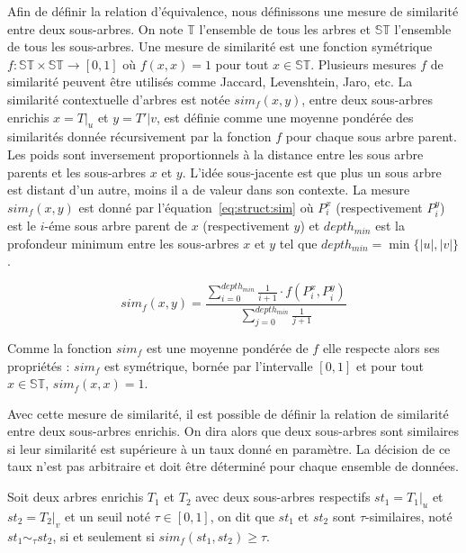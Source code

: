 Afin de définir la relation d'équivalence, nous définissons une mesure de similarité entre deux sous-arbres.
On note $\mathbb{T}$ l'ensemble de tous les arbres et $\mathbb{ST}$ l'ensemble de tous les sous-arbres.
Une mesure de similarité est une fonction symétrique $f : \mathbb{ST} \times \mathbb{ST} \to [0,1]$ où $f(x, x) = 1$ pour tout $x \in \mathbb{ST}$.
Plusieurs mesures $f$ de similarité peuvent être utilisés comme Jaccard, Levenshtein, Jaro, etc.
La similarité contextuelle d'arbres est notée $sim_f(x, y)$, entre deux sous-arbres enrichis $x = T|_u$ et $y = T'|v$, est définie comme une moyenne pondérée des similarités donnée récursivement par la fonction $f$ pour chaque sous arbre parent.
Les poids sont inversement proportionnels à la distance entre les sous arbre parents et les sous-arbres $x$ et $y$.
L'idée sous-jacente est que plus un sous arbre est distant d'un autre, moins il a de valeur dans son contexte.
La mesure $sim_f(x, y)$ est donné par l'équation~\ref{eq:struct:sim} où $P^x_i$ (respectivement $P^y_i$) est le $i$-éme sous arbre parent de $x$ (respectivement $y$) et $depth_{min}$ est la profondeur minimum entre les sous-arbres $x$ et $y$ tel que $depth_{min} = \min\{|u|, |v|\}$.

\begin{equation}
    sim_f(x, y) = \frac{\sum_{i=0}^{depth_{min}} \frac{1}{i + 1} \cdot f(P^x_i, P^y_i)}{\sum_{j=0}^{depth_{min}} \frac{1}{j + 1}} \label{eq:struct:sim}
\end{equation}

\begin{axiom}
    Comme la fonction $sim_f$ est une moyenne pondérée de $f$ elle respecte alors ses propriétés :
    $sim_f$ est symétrique, bornée par l'intervalle $[0, 1]$ et pour tout $x \in \mathbb{ST}$, $sim_f(x, x) = 1$.
\end{axiom}

\begin{example}
\end{example}

Avec cette mesure de similarité, il est possible de définir la relation de similarité entre deux sous-arbres enrichis.
On dira alors que deux sous-arbres sont similaires si leur similarité est supérieure à un taux donné en paramètre.
La décision de ce taux n'est pas arbitraire et doit être déterminé pour chaque ensemble de données.

\begin{definition}
    \label{def:struct:sim}
    Soit deux arbres enrichis $T_1$ et $T_2$ avec deux sous-arbres respectifs $st_1 = T_1|_u$ et $st_2 = T_2|_v$ et un seuil noté $\tau \in [0, 1]$, on dit que $st_1$ et $st_2$ sont $\tau$-similaires, noté $st_1 \sim_\tau st_2$, si et seulement si $sim_f(st_1, st_2) \geq \tau$.
\end{definition}

